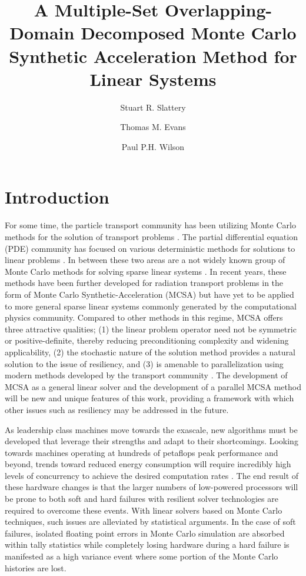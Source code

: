\documentclass{snamc2013}
\title{A Multiple-Set Overlapping-Domain Decomposed Monte Carlo
  Synthetic Acceleration Method for Linear Systems}
\author[1]{Stuart R. Slattery}
\author[2]{Thomas M. Evans}
\author[1]{Paul P.H. Wilson}
\affil[1]{University of Wisconsin - Madison, Engineering Physics
  Department, 1500 Engineering Dr., Madison, WI 53716}
\affil[2]{Oak Ridge National Laboratory, Reactor and Nuclear Systems
  Division, 1 Bethel Valley Rd., Oak Ridge, TN 37831}
\begin{document}
\section{Introduction}

For some time, the particle transport community has been utilizing
Monte Carlo methods for the solution of transport problems
\cite{lewis_computational_1993}. The partial differential equation
(PDE) community has focused on various deterministic methods for
solutions to linear problems \cite{saad_iterative_2003}. In between
these two areas are a not widely known group of Monte Carlo methods
for solving sparse linear systems \cite{forsythe_matrix_1950,
  hammersley_monte_1964, halton_sequential_1962,
  halton_sequential_1994}. In recent years, these methods have been
further developed for radiation transport problems in the form of
Monte Carlo Synthetic-Acceleration (MCSA) \cite{evans_monte_2009,
  evans_monte_2012} but have yet to be applied to more general sparse
linear systems commonly generated by the computational physics
community. Compared to other methods in this regime, MCSA offers three
attractive qualities; (1) the linear problem operator need not be
symmetric or positive-definite, thereby reducing preconditioning
complexity and widening applicability, (2) the stochastic nature of
the solution method provides a natural solution to the issue of
resiliency, and (3) is amenable to parallelization using modern
methods developed by the transport community
\cite{wagner_hybrid_2010}. The development of MCSA as a general linear
solver and the development of a parallel MCSA method will be new and
unique features of this work, providing a framework with which other
issues such as resiliency may be addressed in the future.

As leadership class machines move towards the exascale, new algorithms
must be developed that leverage their strengths and adapt to their
shortcomings. Looking towards machines operating at hundreds of
petaflops peak performance and beyond, trends toward reduced energy
consumption will require incredibly high levels of concurrency to
achieve the desired computation rates \cite{kogge_using_2011}. The end
result of these hardware changes is that the larger numbers of
low-powered processors will be prone to both soft and hard failures
with resilient solver technologies are required to overcome these
events. With linear solvers based on Monte Carlo techniques, such
issues are alleviated by statistical arguments. In the case of soft
failures, isolated floating point errors in Monte Carlo simulation are
absorbed within tally statistics while completely losing hardware
during a hard failure is manifested as a high variance event where
some portion of the Monte Carlo histories are lost.
\end{document}
